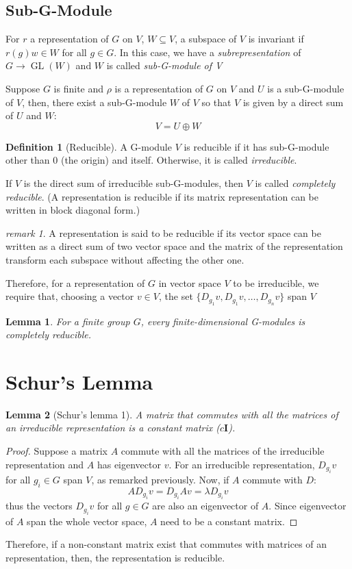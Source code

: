 \documentclass{amsart}
\newtheorem*{lemma}{Lemma}
\theoremstyle{remark}
\newtheorem*{remark}{remark}
\theoremstyle{remark}
\theoremstyle{definition}
\newtheorem*{definition}{Definition}
\DeclareMathOperator{\GL}{GL}
\begin{document}
\subsection*{Sub-G-Module}
For $r$ a representation of $G$ on $V$, $W\subseteq V$, a subspace of $V$ is invariant if 
$r(g)w \in W$ for all $g\in G$. 
In this case, we have a \emph{subrepresentation} of $G\to \GL(W)$ and $W$ is called 
\emph{sub-G-module of V}

Suppose $G$ is finite and $\rho$ is a representation of $G$ on $V$ and $U$ is a sub-G-module of $V$,
then, there exist a sub-G-module $W$ of $V$ so that $V$ is given by a direct sum of $U$ and $W$:
\[V = U \oplus W\]

\begin{definition}
    [Reducible]
    A G-module $V$ is reducible if it has sub-G-module other than $0$ (the origin) and itself. 
    Otherwise, it is called \emph{irreducible}.
\end{definition}
If $V$ is the direct sum of irreducible sub-G-modules, then $V$ is called \emph{completely reducible}.
(A representation is reducible if its matrix representation can be written in block diagonal form.)

\begin{remark}
A representation is said to be reducible if its vector space can be written as a direct sum
of two vector space and the matrix of the representation transform each subspace without affecting 
the other one. 

Therefore, for a representation of $G$ in vector space $V$ to be irreducible, we require that, choosing 
a vector $v \in V$, the set $\{D_{g_1}v, D_{g_1}v,\dots, D_{g_n}v\}$ span $V$
\end{remark}

\begin{lemma}
    For a finite group $G$, every finite-dimensional G-modules is completely reducible.
\end{lemma}

\vspace{10pt}
\section*{Schur's Lemma}
\begin{lemma}
    [Schur's lemma 1]
    A matrix that commutes with all the matrices of an irreducible representation 
    is a constant matrix ($c\mathbf{I}$).
\end{lemma}
\begin{proof}
Suppose a matrix $A$ commute with all the matrices of the irreducible representation and $A$ has 
eigenvector $v$. For an irreducible representation, $D_{g_i}v$ for all $g_i \in G$ span $V$,
as remarked previously. 
Now, if $A$ commute with $D$:
\begin{equation*}
    AD_{g_i}v = D_{g_i}Av = \lambda D_{g_i} v
\end{equation*}
thus the vectors $D_{g_i}v$ for all $g\in G$ are also an eigenvector of $A$. Since eigenvector of $A$ span 
the whole vector space, $A$ need to be a constant matrix.
\end{proof}
Therefore, if a non-constant matrix exist that commutes with matrices of an representation, 
then, the representation is reducible.
\end{document}
